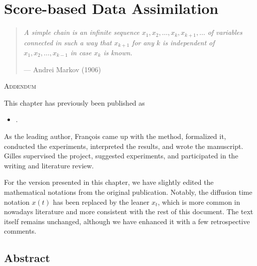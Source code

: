 \chapter{Score-based Data Assimilation} \label{chap:sda}

\begin{quote}
    \textit{A simple chain is an infinite sequence $x_1, x_2, \dots, x_k, x_{k+1}, \dots$ of variables connected in such a way that $x_{k+1}$ for any $k$ is independent of $x_1, x_2, \dots, x_{k-1}$ in case $x_k$ is known.}

    \begin{flushright}
        --- Andrei Markov (1906) \nocite{basharin2004life}
    \end{flushright}
\end{quote}

\vspace{2em}

\begin{addendum}{\Large\scshape Addendum}

This chapter has previously been published as

\begin{itemize}[leftmargin=1em]
    \item[] .
\end{itemize}

As the leading author, François came up with the method, formalized it, conducted the experiments, interpreted the results, and wrote the manuscript. Gilles supervised the project, suggested experiments, and participated in the writing and literature review.

For the version presented in this chapter, we have slightly edited the mathematical notations from the original publication. Notably, the diffusion time notation $x(t)$ has been replaced by the leaner $x_t$, which is more common in nowadays literature and more consistent with the rest of this document. The text itself remains unchanged, although we have enhanced it with a few retrospective comments.

\end{addendum}

\section*{Abstract}

